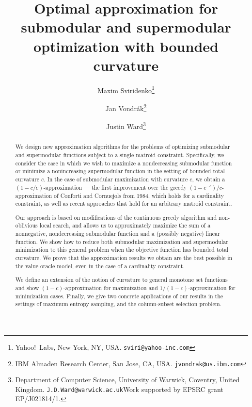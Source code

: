 \documentclass{article}
\author{Maxim Sviridenko\thanks{Yahoo!\ Labs, New York, NY, USA.  \texttt{sviri@yahoo-inc.com}} \and Jan Vondr\'ak\thanks{IBM Almaden Research Center, San Jose, CA, USA.  \texttt{jvondrak@us.ibm.com}} \and Justin Ward\thanks{Department of Computer Science, University of Warwick, Coventry, United Kingdom. \texttt{J.D.Ward@warwick.ac.uk}\enspace Work supported by EPSRC grant EP/J021814/1.}}
\title{Optimal approximation for submodular and supermodular optimization with bounded curvature}
\theoremstyle{definition}
\begin{document}
\maketitle

\setcounter{page}{1}

\begin{abstract}
We design new approximation algorithms for the problems of optimizing submodular and supermodular functions subject to a single matroid constraint.  Specifically, we consider the case in which we wish to maximize a nondecreasing submodular function or minimize a nonincreasing supermodular function in the setting of bounded total curvature $c$. In the case of submodular maximization with curvature $c$, we obtain a $(1-c/e)$-approximation --- the first improvement over the greedy $(1-e^{-c})/c$-approximation of Conforti and Cornuejols from 1984, which holds for a cardinality constraint, as well as recent approaches that hold for an arbitrary matroid constraint.  

Our approach is based on modifications of the continuous greedy algorithm and non-oblivious local search,  and allows us to approximately maximize the sum of a nonnegative, nondecreasing submodular function and a (possibly negative) linear function.  We show how to reduce both submodular maximization and supermodular minimization to this general problem when the objective function has bounded total curvature.
We prove that the approximation results we obtain are the best possible in the value oracle model, even in the case of a cardinality constraint. 

We define an extension of the notion of curvature to general monotone set functions and show $(1-c)$-approximation for maximization and $1/(1-c)$-approximation for minimization cases.   Finally, we give two concrete applications of our results in the settings of maximum entropy sampling, and the column-subset selection problem.
\end{abstract}


\newcommand{\submod}{g}
\newcommand{\lin}{\ell}
\newcommand{\obj}{f}
\newcommand{\submodExt}{G}
\newcommand{\linExt}{L}
\newcommand{\objExt}{F}
\newcommand{\ground}{X}
\newcommand{\I}{\mathcal{I}}
\newcommand{\M}{\mathcal{M}}
\newcommand{\bases}[1]{\mathcal{B}(#1)}
\newcommand{\conv}{\mathrm{conv}}
\newcommand{\rank}[1]{r_{#1}}
\newcommand{\chr}[1]{\mathbf{1}_{#1}}
\newcommand{\cR}{R}

\newcommand{\linmax}{\hat{v}_\lin}
\newcommand{\submodmax}{\hat{v}_\submod}
\newcommand{\vmax}{\hat{v}}
\newcommand{\emax}{\hat{e}}
\newcommand{\elinmax}{\hat{e}_\lin}
\newcommand{\esubmodmax}{\hat{e}_\submod}
\end{document}
